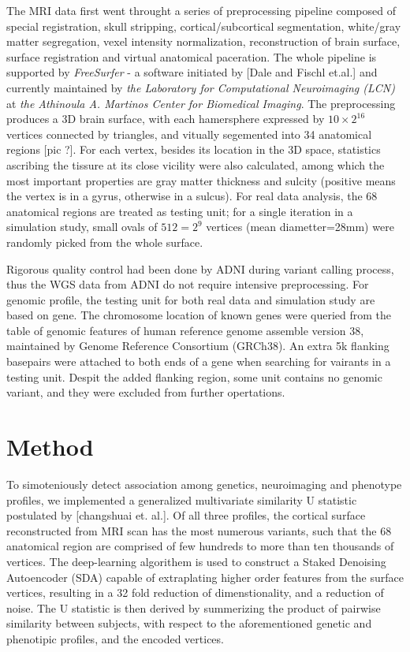 \documentclass[twocolumn]{article}
\begin{document}
The MRI data first went throught a series of preprocessing pipeline composed of special registration, skull stripping, cortical/subcortical segmentation, white/gray matter segregation, vexel intensity normalization, reconstruction of brain surface, surface registration and virtual anatomical paceration. The whole pipeline is supported by \emph{FreeSurfer} - a software initiated by [Dale and Fischl et.al.] and currently maintained by \textit{the Laboratory for Computational Neuroimaging (LCN)}  at \textit {the Athinoula A. Martinos Center for Biomedical Imaging}. The preprocessing produces a 3D brain surface, with each hamersphere expressed by $10\times2^16$ vertices connected by triangles, and vitually segemented into 34 anatomical regions [pic ?]. For each vertex, besides its location in the 3D space, statistics ascribing the tissure at its close vicility were also calculated, among which the most important properties are gray matter thickness and sulcity (positive means the vertex is in a gyrus, otherwise in a sulcus). For real data analysis, the 68 anatomical regions are treated as testing unit; for a single iteration in a simulation study, small ovals of $512=2^9$ vertices (mean diametter=28mm) were randomly picked from the whole surface.

Rigorous quality control had been done by ADNI during variant calling process, thus the WGS data from ADNI do not require intensive preprocessing. For genomic profile, the testing unit for both real data and simulation study are based on gene. The chromosome location of known genes were queried from the table of genomic features of human reference genome assemble version 38, maintained by Genome Reference Consortium (GRCh38). An extra 5k flanking basepairs were attached to both ends of a gene when searching for vairants in a testing unit. Despit the added flanking region, some unit contains no genomic variant, and they were excluded from further opertations.

\section{Method}

To simoteniously detect association among genetics, neuroimaging and phenotype profiles, we implemented a generalized multivariate similarity U statistic postulated by [changshuai et. al.]. Of all three profiles, the cortical surface reconstructed from MRI scan has the most numerous variants, such that the 68 anatomical region are comprised of few hundreds to more than ten thousands of vertices. The deep-learning algorithem is used to construct a Staked Denoising Autoencoder (SDA) capable of extraplating higher order features from the surface vertices, resulting in a 32 fold reduction of dimenstionality, and a reduction of noise. The U statistic is then derived by summerizing the product of pairwise similarity between subjects, with respect to the aforementioned genetic and phenotipic profiles, and the encoded vertices. 
\end{document}
